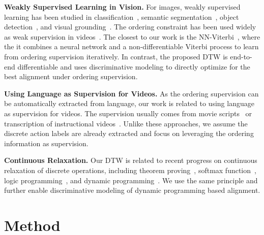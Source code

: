 \documentclass[10pt,twocolumn,letterpaper]{article}
\newcommand{\dttw}{DTW\xspace}
\begin{document}
\vspace{1mm}
\noindent\textbf{Weakly Supervised Learning in Vision.}  For images, weakly supervised learning has been studied in classification~\cite{wu2015deep,mahajan2018exploring}, semantic segmentation~\cite{zhang2015weakly}, object detection~\cite{kumar2016track}, and visual grounding~\cite{karpathy2015deep,xiao2017weakly}. The ordering constraint has been used widely as weak supervision in videos~\cite{bojanowski2014weakly,bojanowski2015weakly,ding2018weakly,huang2016connectionist,richard2017weakly,richard2018neuralnetwork}. The closest to our work is the NN-Viterbi~\cite{richard2018neuralnetwork}, where the it combines a neural network and a non-differentiable Viterbi process to learn from ordering supervision iteratively. In contrast, the proposed \dttw is end-to-end differentiable and uses discriminative modeling to directly optimize for the best alignment under ordering supervision. 



\vspace{1mm}
\noindent\textbf{Using Language as Supervision for Videos.} As the ordering supervision can be automatically extracted from language, our work is related to using language as supervision for videos. The supervision usually comes from movie scripts~\cite{duchenne2009automatic,bojanowski2015weakly,zhu2015aligning} or transcription of instructional videos~\cite{alayrac2015learning,sener2015unsupervised,malmaud2015s,huang-buch-2018-finding-it}. Unlike these approaches, we assume the discrete action labels are already extracted and focus on leveraging the ordering information as supervision.


\vspace{1mm}
\noindent\textbf{Continuous Relaxation.} 
Our \dttw  is related to recent progress on continuous relaxation of discrete operations, including theorem proving~\cite{rocktaschel2017end}, softmax function~\cite{jang2017categorical}, logic programming~\cite{evans2018learning}, and dynamic programming~\cite{mensch2018differentiable, cuturi2017soft}. We use the same principle and further enable discriminative modeling of dynamic programming based alignment.
 \section{Method}
\label{sec:method}
\end{document}
